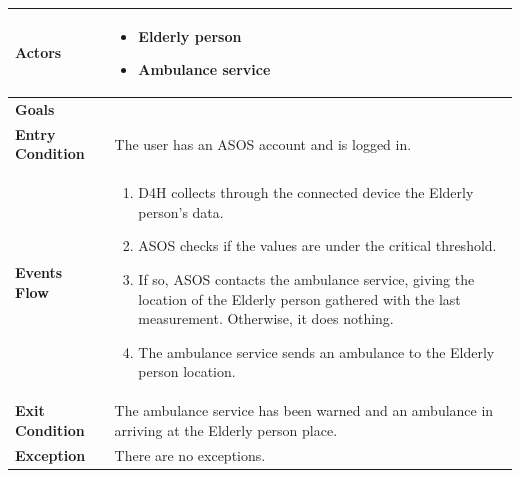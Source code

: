             \begin{table}[H]
            	\centering
                
                \begin{tabular}{|p{3cm}|p{8.2cm}|}
                    \hline
                    \textbf{Actors} & \begin{itemize}
                        \item Elderly person
                        \item Ambulance service
                    \end{itemize} \\
                     \hline
                    \textbf{Goals} & \\ 
                     \hline
                    \textbf{Entry Condition} & The user has an ASOS account and is logged in. \\
                     \hline
                    \textbf{Events Flow} & \begin{enumerate}
                                               \item D4H collects through the connected device the Elderly person's data.
                                               \item ASOS checks if the values are under the critical threshold.
                                               \item If so, ASOS contacts the ambulance service, giving the location of the Elderly person gathered with the last measurement. Otherwise, it does nothing.
                                               \item The ambulance service sends an ambulance to the Elderly person location.
                                           \end{enumerate} \\
                     \hline
                    \textbf{Exit Condition} & The ambulance service has been warned and an ambulance in arriving at the Elderly person place. \\
                     \hline
                    \textbf{Exception} & There are no exceptions. \\
                     \hline
                \end{tabular}  
            \end{table}                 
            
